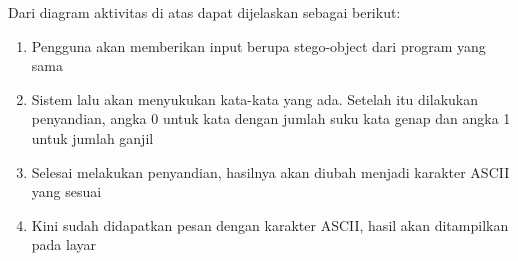 Dari diagram aktivitas di atas dapat dijelaskan sebagai berikut:

\begin{enumerate}
	\item Pengguna akan memberikan input berupa stego-object dari program yang sama
	\item Sistem lalu akan menyukukan kata-kata yang ada. Setelah itu dilakukan penyandian, angka 0 untuk kata dengan jumlah suku kata genap dan angka 1 untuk jumlah ganjil
	\item Selesai melakukan penyandian, hasilnya akan diubah menjadi karakter ASCII yang sesuai
	\item Kini sudah didapatkan pesan dengan karakter ASCII, hasil akan ditampilkan pada layar
\end{enumerate}